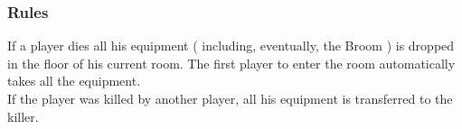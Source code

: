 \subsubsection{Rules}
If a player dies all his equipment ( including, eventually, the Broom ) is dropped in the floor of his current room. The first player to enter the room automatically takes all the equipment. \\
If the player was killed by another player, all his equipment is transferred to the killer. \\
 